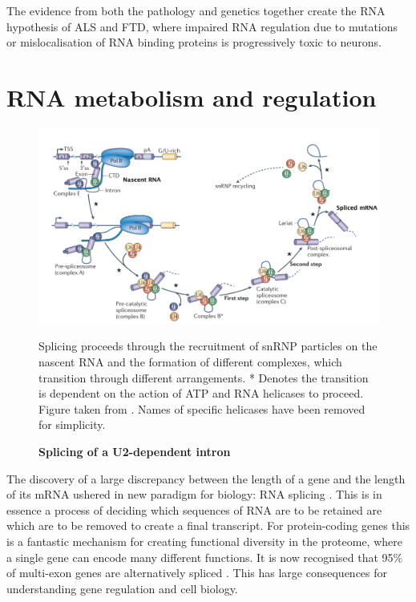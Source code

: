 The evidence from both the pathology and genetics together create the RNA hypothesis of ALS and FTD, where impaired RNA regulation due to mutations or mislocalisation of RNA binding proteins is progressively toxic to neurons.

\section{RNA metabolism and regulation}

\begin{figure}[h!]
	\centering
	\includegraphics[width=\textwidth]{Figures/01_introduction/splicing.png}
	\caption{\textbf{Splicing of a U2-dependent intron} }
	Splicing proceeds through the recruitment of snRNP particles on the nascent RNA and the formation of different complexes, which transition through different arrangements. 
	* Denotes the transition is dependent on the action of ATP and RNA helicases to proceed.
	Figure taken from \citep{Matera2014}. Names of specific helicases have been removed for simplicity.
	\label{fig:intro_splicing}
\end{figure}

The discovery of a large discrepancy between the length of a gene and the length of its mRNA ushered in new paradigm for biology: RNA splicing \citep{Berget1977,Chow1977}.
This is in essence a process of deciding which sequences of RNA are to be retained are which are to be removed to create a final transcript.
For protein-coding genes this is a fantastic mechanism for creating functional diversity in the proteome, where a single gene can encode many different functions.
It is now recognised that 95\% of multi-exon genes are alternatively spliced \citep{Pan2008,Wang2008}. This has large consequences for understanding gene regulation and cell biology.

